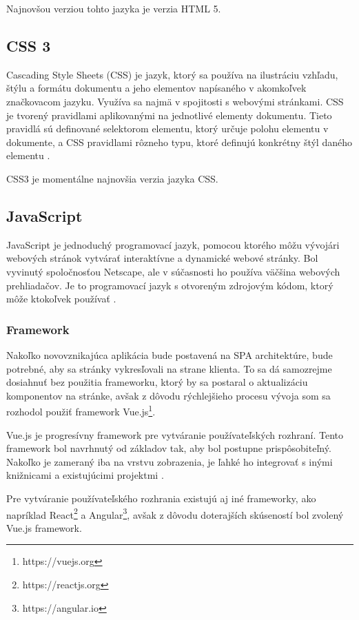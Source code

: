 Najnovšou verziou tohto jazyka je verzia HTML 5.

\subsection{CSS 3}
Cascading Style Sheets (CSS) je jazyk, ktorý sa používa na ilustráciu vzhľadu, štýlu a formátu dokumentu a jeho elementov napísaného v akomkoľvek značkovacom jazyku. Využíva sa najmä v spojitosti s webovými stránkami. CSS je tvorený pravidlami aplikovanými na jednotlivé elementy dokumentu. Tieto pravidlá sú definované selektorom elementu, ktorý určuje polohu elementu v dokumente, a CSS pravidlami rôzneho typu, ktoré definujú konkrétny štýl daného elementu \cite{co-je-css}. 

CSS3 je momentálne najnovšia verzia jazyka CSS.

\subsection{JavaScript}
JavaScript je jednoduchý programovací jazyk, pomocou ktorého môžu vývojári webových stránok vytvárať interaktívne a dynamické webové stránky. Bol vyvinutý spoločnosťou Netscape, ale v súčasnosti ho používa väčšina webových prehliadačov. Je to programovací jazyk s otvoreným zdrojovým kódom, ktorý môže ktokoľvek používať \cite{co-je-js}.

\subsubsection*{Framework}
Nakoľko novovznikajúca aplikácia bude postavená na SPA architektúre, bude potrebné, aby sa stránky vykresľovali na strane klienta. To sa dá samozrejme dosiahnuť bez použitia frameworku, ktorý by sa postaral o aktualizáciu komponentov na stránke, avšak z dôvodu rýchlejšieho procesu vývoja som sa rozhodol použiť framework Vue.js\footnote{https://vuejs.org}.

Vue.js je progresívny framework pre vytváranie používateľských rozhraní. Tento framework bol navrhnutý od základov tak, aby bol postupne prispôsobiteľný. Nakoľko je zameraný iba na vrstvu zobrazenia, je ľahké ho integrovať s inými knižnicami a existujúcimi projektmi \cite{co-je-vue}.

Pre vytváranie používateľského rozhrania existujú aj iné frameworky, ako napríklad React\footnote{https://reactjs.org} a Angular\footnote{https://angular.io}, avšak z dôvodu doterajších skúseností bol zvolený Vue.js framework.

